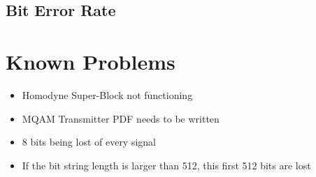 \documentclass[a4paper]{article}
\begin{document}
\subsection{Bit Error Rate}


\section{Known Problems}

\begin{itemize}
\item Homodyne Super-Block not functioning
\item MQAM Transmitter PDF needs to be written
\item 8 bits being lost of every signal
\item If the bit string length is larger than 512, this first 512 bits are lost
\end{itemize}
\end{document}
